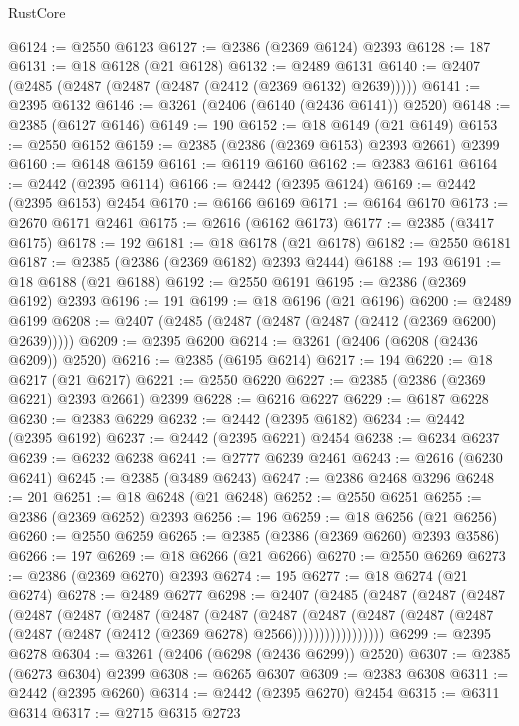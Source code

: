 \begin{lexlean}{RustCore}
\begin{coremodule}
@6124 := @2550 @6123
@6127 := @2386 (@2369 @6124) @2393
@6128 := 187
@6131 := @18 @6128 (@21 @6128)
@6132 := @2489 @6131
@6140 := @2407 (@2485 (@2487 (@2487 (@2487 (@2412 (@2369 @6132) @2639)))))
@6141 := @2395 @6132
@6146 := @3261 (@2406 (@6140 (@2436 @6141)) @2520)
@6148 := @2385 (@6127 @6146)
@6149 := 190
@6152 := @18 @6149 (@21 @6149)
@6153 := @2550 @6152
@6159 := @2385 (@2386 (@2369 @6153) @2393 @2661) @2399
@6160 := @6148 @6159
@6161 := @6119 @6160
@6162 := @2383 @6161
@6164 := @2442 (@2395 @6114)
@6166 := @2442 (@2395 @6124)
@6169 := @2442 (@2395 @6153) @2454
@6170 := @6166 @6169
@6171 := @6164 @6170
@6173 := @2670 @6171 @2461
@6175 := @2616 (@6162 @6173)
@6177 := @2385 (@3417 @6175)
@6178 := 192
@6181 := @18 @6178 (@21 @6178)
@6182 := @2550 @6181
@6187 := @2385 (@2386 (@2369 @6182) @2393 @2444)
@6188 := 193
@6191 := @18 @6188 (@21 @6188)
@6192 := @2550 @6191
@6195 := @2386 (@2369 @6192) @2393
@6196 := 191
@6199 := @18 @6196 (@21 @6196)
@6200 := @2489 @6199
@6208 := @2407 (@2485 (@2487 (@2487 (@2487 (@2412 (@2369 @6200) @2639)))))
@6209 := @2395 @6200
@6214 := @3261 (@2406 (@6208 (@2436 @6209)) @2520)
@6216 := @2385 (@6195 @6214)
@6217 := 194
@6220 := @18 @6217 (@21 @6217)
@6221 := @2550 @6220
@6227 := @2385 (@2386 (@2369 @6221) @2393 @2661) @2399
@6228 := @6216 @6227
@6229 := @6187 @6228
@6230 := @2383 @6229
@6232 := @2442 (@2395 @6182)
@6234 := @2442 (@2395 @6192)
@6237 := @2442 (@2395 @6221) @2454
@6238 := @6234 @6237
@6239 := @6232 @6238
@6241 := @2777 @6239 @2461
@6243 := @2616 (@6230 @6241)
@6245 := @2385 (@3489 @6243)
@6247 := @2386 @2468 @3296
@6248 := 201
@6251 := @18 @6248 (@21 @6248)
@6252 := @2550 @6251
@6255 := @2386 (@2369 @6252) @2393
@6256 := 196
@6259 := @18 @6256 (@21 @6256)
@6260 := @2550 @6259
@6265 := @2385 (@2386 (@2369 @6260) @2393 @3586)
@6266 := 197
@6269 := @18 @6266 (@21 @6266)
@6270 := @2550 @6269
@6273 := @2386 (@2369 @6270) @2393
@6274 := 195
@6277 := @18 @6274 (@21 @6274)
@6278 := @2489 @6277
@6298 := @2407
    (@2485
      (@2487
        (@2487
          (@2487
            (@2487
              (@2487
                (@2487
                  (@2487
                    (@2487
                      (@2487
                        (@2487
                          (@2487
                            (@2487 (@2487 (@2487 (@2487 (@2412 (@2369 @6278) @2566)))))))))))))))))
@6299 := @2395 @6278
@6304 := @3261 (@2406 (@6298 (@2436 @6299)) @2520)
@6307 := @2385 (@6273 @6304) @2399
@6308 := @6265 @6307
@6309 := @2383 @6308
@6311 := @2442 (@2395 @6260)
@6314 := @2442 (@2395 @6270) @2454
@6315 := @6311 @6314
@6317 := @2715 @6315 @2723

\end{coremodule}
\end{lexlean}
